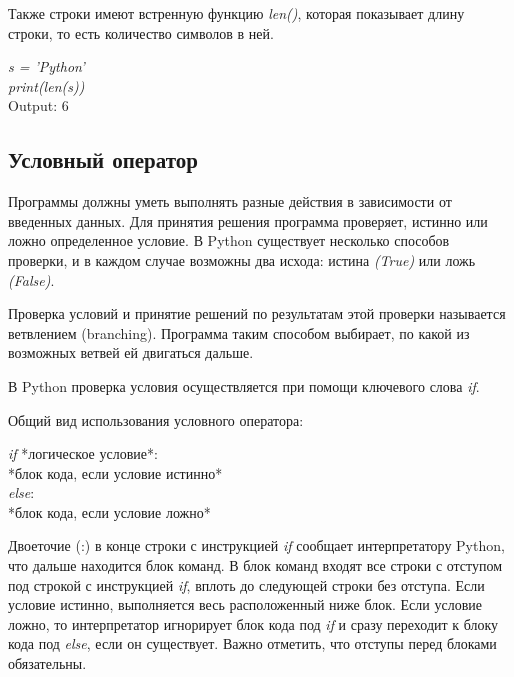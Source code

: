 Также строки имеют встренную функцию \colorbox[rgb]{0.95, 0.95, 0.95}{\textit{len()}}, которая показывает длину строки, то есть количество символов в ней.

\begin{flushleft}
	\colorbox[rgb]{0.95, 0.95, 0.95}{\textit{s = 'Python'}} \\
	\colorbox[rgb]{0.95, 0.95, 0.95}{\textit{print(len(s))}} \\
	\vspace{1cm}
	\colorbox[rgb]{0.95, 0.95, 0.95}{Output: 6}
\end{flushleft}

\subsection{Условный оператор}

Программы должны уметь выполнять разные действия в зависимости от введенных данных. Для принятия решения программа проверяет, истинно или ложно определенное условие. В Python существует несколько способов проверки, и в каждом случае возможны два исхода: истина \textit{(True)} или ложь \textit{(False)}. 

Проверка условий и принятие решений по результатам этой проверки называется ветвлением (branching). Программа таким способом выбирает, по какой из возможных ветвей ей двигаться дальше.

В Python проверка условия осуществляется при помощи ключевого слова \colorbox[rgb]{0.95, 0.95, 0.95}{\textit{if}}.

Общий вид использования условного оператора:

\begin{flushleft}
	\colorbox[rgb]{0.95, 0.95, 0.95}{\textit{if} *логическое условие*:} \\
	\colorbox[rgb]{0.95, 0.95, 0.95}{\hspace{1cm} *блок кода, если условие истинно*} \\
	\colorbox[rgb]{0.95, 0.95, 0.95}{\textit{else}:} \\
	\colorbox[rgb]{0.95, 0.95, 0.95}{\hspace{1cm} *блок кода, если условие ложно*} \\
\end{flushleft}

Двоеточие (:) в конце строки с инструкцией \colorbox[rgb]{0.95, 0.95, 0.95}{\textit{if}} сообщает интерпретатору Python, что дальше находится блок команд. В блок команд входят все строки с отступом под строкой с инструкцией \colorbox[rgb]{0.95, 0.95, 0.95}{\textit{if}}, вплоть до следующей строки без отступа. Если условие истинно, выполняется весь расположенный ниже блок. Если условие ложно, то интерпретатор игнорирует блок кода под \colorbox[rgb]{0.95, 0.95, 0.95}{\textit{if}} и сразу переходит к блоку кода под \colorbox[rgb]{0.95, 0.95, 0.95}{\textit{else}}, если он существует. Важно отметить, что отступы перед блоками обязательны.

